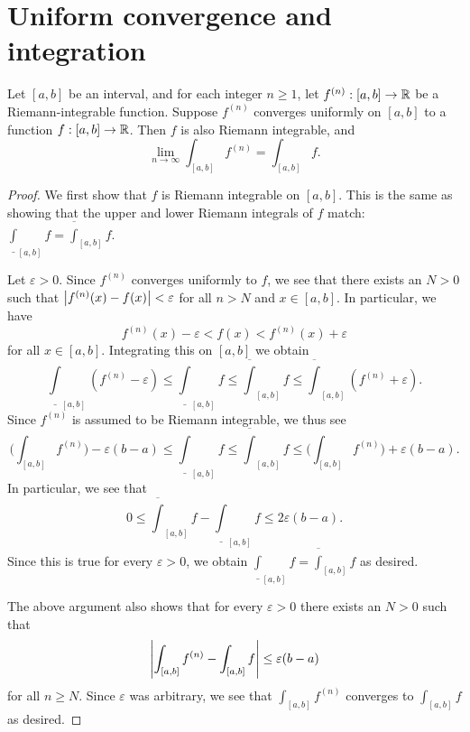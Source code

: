 \section{Uniform convergence and integration}\label{ii:sec:3.6}

\begin{thm}\label{ii:3.6.1}
  Let \([a, b]\) be an interval, and for each integer \(n \geq 1\), let \(f^{(n)} : [a, b] \to \mathbb{R}\) be a Riemann-integrable function.
  Suppose \(f^{(n)}\) converges uniformly on \([a, b]\) to a function \(f : [a, b] \to \mathbb{R}\).
  Then \(f\) is also Riemann integrable, and
  \[
    \lim_{n \to \infty} \int_{[a, b]} f^{(n)} = \int_{[a, b]} f.
  \]
\end{thm}

\begin{proof}
  We first show that \(f\) is Riemann integrable on \([a, b]\).
  This is the same as showing that the upper and lower Riemann integrals of \(f\) match:
  \(\underline{\int}_{[a, b]} f = \overline{\int}_{[a, b]} f\).

  Let \(\varepsilon > 0\).
  Since \(f^{(n)}\) converges uniformly to \(f\), we see that there exists an \(N > 0\) such that \(\left\lvert f^{(n)}(x) - f(x)\right\rvert < \varepsilon\) for all \(n > N\) and \(x \in [a, b]\).
  In particular, we have
  \[
    f^{(n)}(x) - \varepsilon < f(x) < f^{(n)}(x) + \varepsilon
  \]
  for all \(x \in [a, b]\).
  Integrating this on \([a, b]\) we obtain
  \[
    \underline{\int}_{[a, b]} (f^{(n)} - \varepsilon) \leq \underline{\int}_{[a, b]} f \leq \overline{\int}_{[a, b]} f \leq \overline{\int}_{[a, b]} (f^{(n)} + \varepsilon).
  \]
  Since \(f^{(n)}\) is assumed to be Riemann integrable, we thus see
  \[
    \Bigg(\int_{[a, b]} f^{(n)}\Bigg) - \varepsilon (b - a) \leq \underline{\int}_{[a, b]} f \leq \overline{\int}_{[a, b]} f \leq \Bigg(\int_{[a, b]} f^{(n)}\Bigg) + \varepsilon (b - a).
  \]
  In particular, we see that
  \[
    0 \leq \overline{\int}_{[a, b]} f - \underline{\int}_{[a, b]} f \leq 2 \varepsilon (b - a).
  \]
  Since this is true for every \(\varepsilon > 0\), we obtain \(\underline{\int}_{[a, b]} f = \overline{\int}_{[a, b]} f\) as desired.

  The above argument also shows that for every \(\varepsilon > 0\) there exists an \(N > 0\) such that
  \[
    \left\lvert\int_{[a, b]} f^{(n)} - \int_{[a, b]} f\right\rvert \leq \varepsilon (b - a)
  \]
  for all \(n \geq N\).
  Since \(\varepsilon\) was arbitrary, we see that \(\int_{[a, b]} f^{(n)}\) converges to \(\int_{[a, b]} f\) as desired.
\end{proof}

